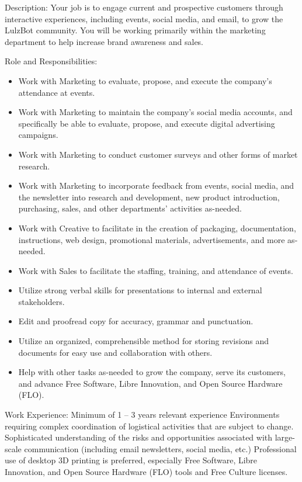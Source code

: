 Description: Your job is to engage current and prospective customers through interactive experiences, including events, social media, and email, to grow the LulzBot community. You will be working primarily within the marketing department to help increase brand awareness and sales.

Role and Responsibilities:
\begin{itemize}
 \item Work with Marketing to evaluate, propose, and execute the company's attendance at events.
 \item Work with Marketing to maintain the company's social media accounts, and specifically be able to evaluate, propose, and execute digital advertising campaigns.
 \item Work with Marketing to conduct customer surveys and other forms of market research.
 \item Work with Marketing to incorporate feedback from events, social media, and the newsletter into research and development, new product introduction, purchasing, sales, and other departments' activities as-needed.
 \item Work with Creative to facilitate in the creation of packaging, documentation, instructions, web design, promotional materials, advertisements, and more as-needed.
 \item Work with Sales to facilitate the staffing, training, and attendance of events.
 \item Utilize strong verbal skills for presentations to internal and external stakeholders.
 \item Edit and proofread copy for accuracy, grammar and punctuation.
 \item Utilize an organized, comprehensible method for storing revisions and documents for easy use and collaboration with others.
 \item Help with other tasks as-needed to grow the company, serve its customers, and advance Free Software, Libre Innovation, and Open Source Hardware (FLO).
\end{itemize}

Work Experience:
Minimum of 1 – 3 years relevant experience
Environments requiring complex coordination of logistical activities that are subject to change.
Sophisticated understanding of the risks and opportunities associated with large-scale communication (including email newsletters, social media, etc.) 
Professional use of desktop 3D printing is preferred, especially Free Software, Libre Innovation, and Open Source Hardware (FLO) tools and Free Culture licenses.

